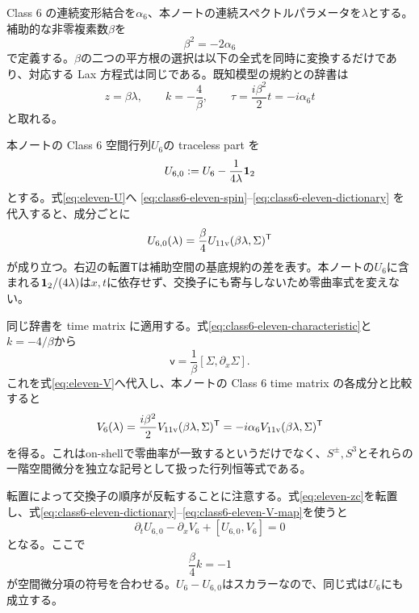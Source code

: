 Class 6 の連続変形結合を$\alpha_6$、本ノートの連続スペクトルパラメータを$\lambda$とする。補助的な非零複素数$\beta$を
\begin{equation}
\beta^2=-2\alpha_6
\label{eq:class6-eleven-beta}
\end{equation}
で定義する。$\beta$の二つの平方根の選択は以下の全式を同時に変換するだけであり、対応する Lax 方程式は同じである。既知模型の規約との辞書は
\begin{equation}
z=\beta\lambda,
\qquad
k=-\frac4\beta,
\qquad
\tau=\frac{i\beta^2}{2}t=-i\alpha_6 t
\label{eq:class6-eleven-dictionary}
\end{equation}
と取れる。

本ノートの Class 6 空間行列$U_6$の traceless part を
\begin{equation}
U_{6,0}:=U_6-\frac{1}{4\lambda}\mathbf 1_2
\label{eq:class6-eleven-U0}
\end{equation}
とする。式\eqref{eq:eleven-U}へ
\eqref{eq:class6-eleven-spin}--\eqref{eq:class6-eleven-dictionary}
を代入すると、成分ごとに
\begin{equation}
U_{6,0}(\lambda)
=\frac{\beta}{4}
U_{\rm 11v}(\beta\lambda,\Sigma)^{\mathsf T}
\label{eq:class6-eleven-U-map}
\end{equation}
が成り立つ。右辺の転置$\mathsf T$は補助空間の基底規約の差を表す。本ノートの$U_6$に含まれる$\mathbf 1_2/(4\lambda)$は$x,t$に依存せず、交換子にも寄与しないため零曲率式を変えない。

同じ辞書を time matrix に適用する。式\eqref{eq:class6-eleven-characteristic}と$k=-4/\beta$から
\begin{equation}
\mathsf v
=\frac1\beta[\Sigma,\partial_x\Sigma].
\end{equation}
これを式\eqref{eq:eleven-V}へ代入し、本ノートの Class 6 time matrix の各成分と比較すると
\begin{equation}
V_6(\lambda)
=\frac{i\beta^2}{2}
V_{\rm 11v}(\beta\lambda,\Sigma)^{\mathsf T}
=-i\alpha_6
V_{\rm 11v}(\beta\lambda,\Sigma)^{\mathsf T}
\label{eq:class6-eleven-V-map}
\end{equation}
を得る。これはon-shellで零曲率が一致するというだけでなく、$S^\pm,S^3$とそれらの一階空間微分を独立な記号として扱った行列恒等式である。

転置によって交換子の順序が反転することに注意する。式\eqref{eq:eleven-zc}を転置し、式\eqref{eq:class6-eleven-dictionary}--\eqref{eq:class6-eleven-V-map}を使うと
\begin{equation}
\partial_tU_{6,0}
-\partial_xV_6+[U_{6,0},V_6]=0
\end{equation}
となる。ここで
\begin{equation}
\frac{\beta}{4}k=-1
\end{equation}
が空間微分項の符号を合わせる。$U_6-U_{6,0}$はスカラーなので、同じ式は$U_6$にも成立する。

